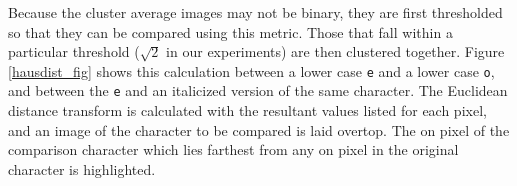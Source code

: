 \documentclass[times, 10pt,twocolumn]{article}
\begin{document}
Because the cluster average images may not be 
binary, they are first thresholded so that they can be compared using
this metric.
%
Those that fall within a particular threshold ($\sqrt 2$ in our
experiments) are then clustered together.  Figure \ref{hausdist_fig}
shows this calculation between a lower case {\tt e} and a lower case {\tt o}, 
and between the {\tt e} and an italicized version of the same character.  The 
Euclidean distance transform is calculated with the resultant values listed for 
each pixel, and an image of the character to be compared is laid overtop.  The 
on pixel of the comparison character which lies farthest from any on pixel in 
the original character is highlighted. 
\end{document}

